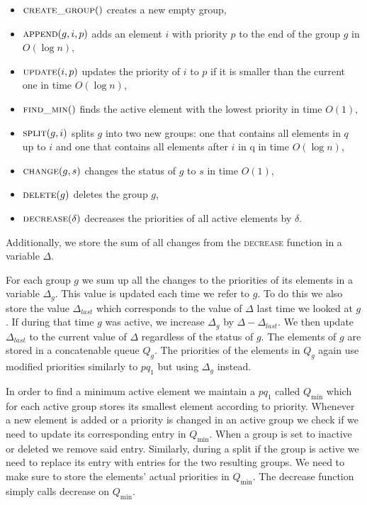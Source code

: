 \begin{itemize}
    \item $\textsc{create\_group}()$ creates a new empty group,
    \item $\textsc{append}(g, i, p)$ adds an element $i$ with priority $p$ to the end of the group $g$ in $O(\log n)$,
    \item $\textsc{update}(i, p)$ updates the priority of $i$ to $p$ if it is smaller than the current one in time $O(\log n)$,
    \item $\textsc{find\_min}()$ finds the active element with the lowest priority in time $O(1)$,
    \item $\textsc{split}(g, i)$ splits $g$ into two new groups: one that contains all elements in $q$ up to $i$ and one that contains all elements after $i$ in q in time $O(\log n)$,
    \item $\textsc{change}(g, s)$ changes the status of $g$ to $s$ in time $O(1)$,
    \item $\textsc{delete}(g)$ deletes the group $g$,
    \item $\textsc{decrease}(\delta)$ decreases the priorities of all active elements by $\delta$.
\end{itemize}

Additionally, we store the sum of all changes from the \textsc{decrease} function in a variable $\Delta$.

For each group $g$ we sum up all the changes to the priorities of its elements in a variable $\Delta_g$. This value is updated each time we refer to $g$. To do this we also store the value $\Delta_{last}$ which corresponds to the value of $\Delta$ last time we looked at $g$. If during that time $g$ was active, we increase $\Delta_g$ by $\Delta - \Delta_{last}$. We then update $\Delta_{last}$ to the current value of $\Delta$ regardless of the status of $g$. The elements of $g$ are stored in a concatenable queue $Q_g$. The priorities of the elements in $Q_g$ again use modified priorities similarly to $pq_1$ but using $\Delta_g$ instead. 

In order to find a minimum active element we maintain a $pq_1$ called $Q_{\min}$ which for each active group stores its smallest element according to priority. Whenever a new element is added or a priority is changed in an active group we check if we need to update its corresponding entry in $Q_{\min}$. When a group is set to inactive or deleted we remove said entry. Similarly, during a split if the group is active we need to replace its entry with entries for the two resulting groups. We need to make sure to store the elements' actual priorities in $Q_{\min}$. The decrease function simply calls decrease on $Q_{\min}$.

